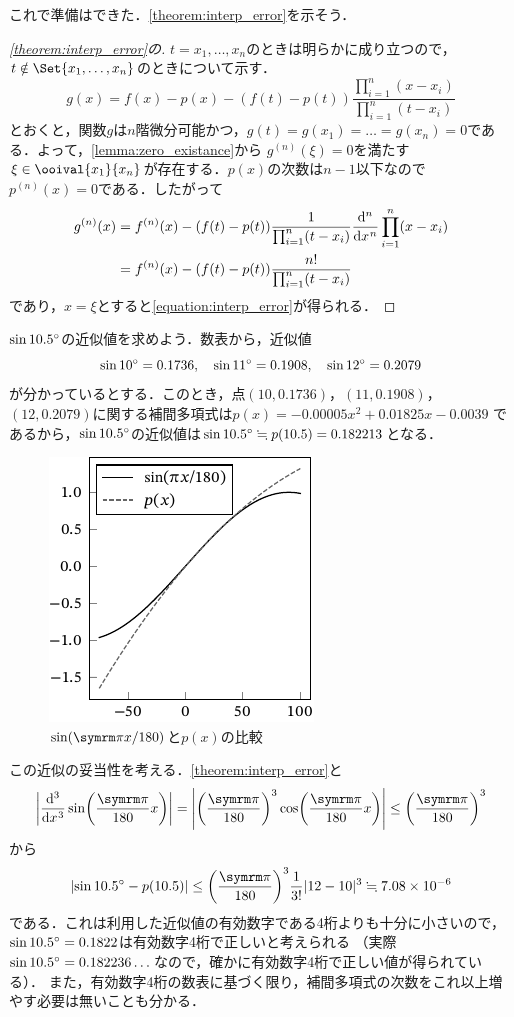 \documentclass[../../numcalc]{subfiles}
\begin{document}
これで準備はできた．\cref{theorem:interp_error}を示そう．

\begin{proof}[\cref{theorem:interp_error}の\proofname]
\(t=x_1,\dots,x_n\)のときは明らかに成り立つので，\(t\notin\Set{x_1,\dots,x_n}\)のときについて示す．
\[
  g(x) = f(x)-p(x)-(f(t)-p(t))\frac{\prod_{i=1}^n(x-x_i)}{\prod_{i=1}^n(t-x_i)}
\]
とおくと，関数\(g\)は\(n\)階微分可能かつ，\(g(t)=g(x_1)=\dots=g(x_n)=0\)である．よって，\cref{lemma:zero_existance}から
\(g^{(n)}(\xi)=0\)を満たす\(\xi\in\ooival{x_1}{x_n}\)が存在する．\(p(x)\)の次数は\(n-1\)以下なので\(p^{(n)}(x)=0\)である．したがって
\begin{align*}
  g^{(n)}(x) &= f^{(n)}(x)-(f(t)-p(t))\frac{1}{\prod_{i=1}^n(t-x_i)}\diff*[n]{\prod_{i=1}^n(x-x_i)}{x} \\
  &= f^{(n)}(x)-(f(t)-p(t))\frac{n!}{\prod_{i=1}^n(t-x_i)}
\end{align*}
であり，\(x=\xi\)とすると\cref{equation:interp_error}が得られる．
\end{proof}

\begin{example}
\(\sin10.5^{\mathord{\circ}}\)の近似値を求めよう．数表から，近似値
\[
  \sin10^{\mathord{\circ}} = 0.1736,
  \quad\sin11^{\mathord{\circ}} = 0.1908,
  \quad\sin12^{\mathord{\circ}} = 0.2079
\]
が分かっているとする．このとき，点\((10,0.1736)\)，\((11,0.1908)\)，\((12,0.2079)\)に関する補間多項式は\(p(x)=-0.00005x^2+0.01825x-0.0039\)
であるから，\(\sin10.5^{\mathord{\circ}}\)の近似値は\(\sin10.5^{\mathord{\circ}}\fallingdotseq p(10.5)=0.182213\)となる．

\begin{figure}[htbp]
  \centering
  \includegraphics{sin.pdf}
  \caption{\(\sin(\krez x/180)\)と\(p(x)\)の比較}
\end{figure}

この近似の妥当性を考える．\cref{theorem:interp_error}と
\[
  \abs*{\diff*[3]{\sin\pqty*{\frac{\krez}{180}x}}{x}} = \abs*{\pqty*{\frac{\krez}{180}}^3\cos\pqty*{\frac{\krez}{180}x}}
  \leq \pqty*{\frac{\krez}{180}}^3
\]
から
\[
  \abs*{\sin\degree{10.5}-p(10.5)} \leq \pqty*{\frac{\krez}{180}}^3\frac{1}{3!}\abs{12-10}^3
  \fallingdotseq 7.08\times 10^{-6}
\]
である．これは利用した近似値の有効数字である4桁よりも十分に小さいので，\(\sin10.5^{\mathord{\circ}}=0.1822\)は有効数字4桁で正しいと考えられる
（実際\(\sin10.5^{\mathord{\circ}}=0.182236\dots\)なので，確かに有効数字4桁で正しい値が得られている）．
また，有効数字4桁の数表に基づく限り，補間多項式の次数をこれ以上増やす必要は無いことも分かる．
\end{example}
\end{document}
